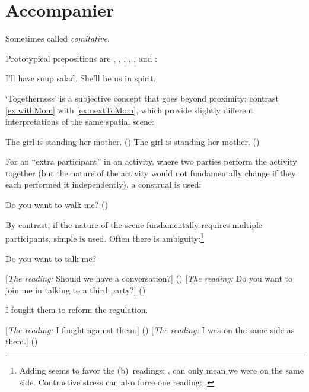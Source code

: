 \section{Accompanier}


Sometimes called \emph{comitative}.

Prototypical prepositions are , , , 
, , and :
\begin{exe}
  \ex I'll have soup  salad.
  \ex She'll be  us in spirit.
\end{exe}
`Togetherness' is a subjective concept that goes beyond proximity; 
contrast \cref{ex:withMom} with \cref{ex:nextToMom}, which 
provide slightly different interpretations of the same spatial scene:
\begin{xexe}
  \ex\label{ex:withMom} The girl is standing  her mother. ()
  \ex\label{ex:nextToMom} The girl is standing  her mother. ()
\end{xexe}

For an ``extra participant'' in an activity, 
where two parties perform the activity together 
(but the nature of the activity would not fundamentally 
change if they each performed it independently), 
a  construal is used:
\begin{exe}
  \ex Do you want to walk  me? ()
\end{exe}
By contrast, if the nature of the scene fundamentally requires multiple participants, 
simple  is used. Often there is ambiguity:\footnote{Adding  
seems to favor the (b)~readings: ,  
can only mean we were on the same side. Contrastive stress can also force one reading: 
.}
\begin{exe}
  \ex Do you want to talk  me? 
  \begin{xlist}
    \ex {}[\emph{The reading:} Should we have a conversation?] ()
    \ex {}[\emph{The reading:} Do you want to join me in talking to a third party?] 
      ()
  \end{xlist}
  \ex I fought  them to reform the regulation.
  \begin{xlist}
    \ex {}[\emph{The reading:} I fought against them.] ()
    \ex {}[\emph{The reading:} I was on the same side as them.] ()
  \end{xlist}
\end{exe}

